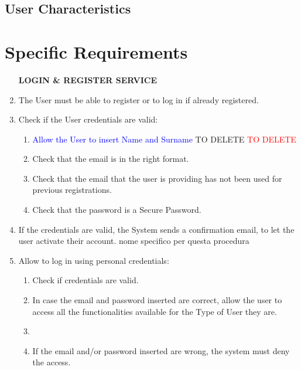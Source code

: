 \documentclass[a4paper, 10pt, oneside]{article}
\newcommand*{\lorenzo}[1]{\textcolor{BurntOrange}{#1}}
\newcommand{\yasmin}[1]{\textcolor{Red}{#1}}
\newcommand{\giovanni}[1]{\textcolor{Blue}{#1}}
\begin{document}
\subsection{User Characteristics}

\section{Specific Requirements}
\label{specificRequirements}

\begin{enumerate}[align=left]
    \item[\textbf{LOGIN \& REGISTER SERVICE}]
    \item The User must be able to register or to log in if already registered.
    \item \label{req:credentialsCheck} Check if the User credentials are valid:
    \begin{enumerate}[label={-}]
        \item \giovanni{Allow the User to insert Name and Surname} \lorenzo{TO DELETE} \yasmin{TO DELETE} %
        \item \label{req:credentialsCheck:email} Check that the email is in the right format.
        \item \label{req:credentialsCheck:uniqueness} Check that the email that the user is providing has not been used for previous registrations.
        \item \label{req:credentialsCheck:password}Check that the password is a Secure Password.
    \end{enumerate}
    \item \label{req:confirmRegistration}If the credentials are valid, the System sends a confirmation email, to let the user activate their account. \lorenzo{nome specifico per questa procedura}
    \item \label{req:login} Allow to log in using personal credentials:
    \begin{enumerate}[label={-}]
        \item \label{req:login:checkCred}Check if credentials are valid.
        \item \label{req:login:validCred} In case the email and password inserted are correct, allow the user to access all the functionalities available for the Type of User they are.
        \item \item \label{req:login:invalidCred} If the email and/or password inserted are wrong, the system must deny the access.

\end{enumerate}
\end{enumerate}
\end{document}
